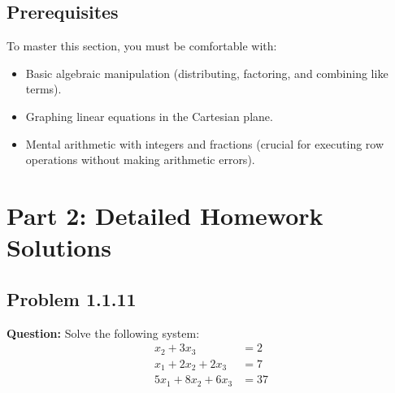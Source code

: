 \documentclass[11pt]{article}
\begin{document}
\subsection{Prerequisites}
To master this section, you must be comfortable with:
\begin{itemize}
    \item Basic algebraic manipulation (distributing, factoring, and combining like terms).
    \item Graphing linear equations in the Cartesian plane.
    \item Mental arithmetic with integers and fractions (crucial for executing row operations without making arithmetic errors).
\end{itemize}

\newpage
\section{Part 2: Detailed Homework Solutions}

\subsection*{Problem 1.1.11}
\textbf{Question:} Solve the following system:
\begin{align*}
              x_2 + 3x_3 &= 2 \\
    x_1 + 2x_2 + 2x_3 &= 7 \\
    5x_1 + 8x_2 + 6x_3 &= 37
\end{align*}
\end{document}
